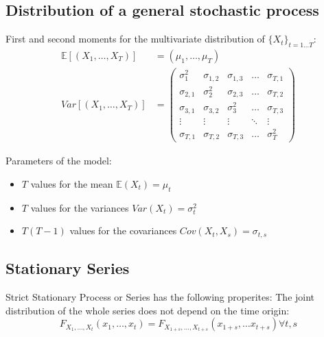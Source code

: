 \subsection{Distribution of a general stochastic process}

First and second moments for the multivariate distribution of $\{X_t\}_{t=1\dots T}$:
\begin{align*}
	\mathbb{E}[(X_1, \dots, X_T)] & = (\mu_1, \dots, \mu_T)                                              \\
	Var[(X_1, \dots, X_T)]        & = \begin{pmatrix}
		                                  \sigma_1^2   & \sigma_{1,2} & \sigma_{1,3} & \dots  & \sigma_{T,1} \\
		                                  \sigma_{2,1} & \sigma_2^2   & \sigma_{2,3} & \dots  & \sigma_{T,2} \\
		                                  \sigma_{3,1} & \sigma_{3,2} & \sigma_3^2   & \dots  & \sigma_{T,3} \\
		                                  \vdots       & \vdots       & \vdots       & \ddots & \vdots       \\
		                                  \sigma_{T,1} & \sigma_{T,2} & \sigma_{T,3} & \dots  & \sigma_T^2
	                                  \end{pmatrix}
\end{align*}

Parameters of the model:
\begin{itemize}
    \item $T$ values for the mean $\mathbb{E}(X_t) = \mu_t$
    \item $T$ values for the variances $Var(X_t) = \sigma_t^2$
    \item $T(T-1)$ values for the covariances $Cov(X_t, X_s) = \sigma_{t,s}$
\end{itemize}

\subsection{Stationary Series}

Strict Stationary Process or Series has the following properites:
The joint distribution of the whole series does not depend on the time
origin:
\begin{equation}
    F_{X_1, \dots, X_t}(x_1, \dots, x_t) = F_{X_{1+s}, \dots, X_{t+s}}(x_{1+s}, \dots x_{t+s}) \forall t,s
\end{equation}

